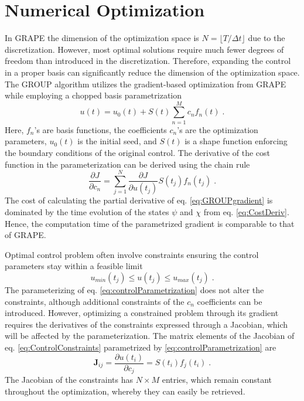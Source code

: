 \section{Numerical Optimization}

In GRAPE the dimension of the optimization space is $N = \lfloor T / \Delta t \rfloor$ due to the discretization. However, most optimal solutions require much fewer degrees of freedom than introduced in the discretization. Therefore, expanding the control in a proper basis can significantly reduce the dimension of the optimization space.
The GROUP algorithm utilizes the gradient-based optimization from GRAPE while employing a chopped basis parametrization 
\begin{equation}
	u(t) = u_0 (t) + S(t) \sum_{n=1}^{M} c_n f_n (t) \; . \label{eq:controlParametrization}
\end{equation}
Here, $f_n$'s are basis functions, the coefficients $c_n$'s are the optimization parameters, $u_0 (t)$ is the initial seed, and $S(t)$ is a shape function enforcing the boundary conditions of the original control. The derivative of the cost function in the parameterization can be derived using the chain rule
\begin{equation}
	\frac{\partial J }{\partial c_n} = \sum_{j = 1}^{N} \frac{\partial J }{\partial u(t_j)} S(t_j) f_n(t_j) \; . \label{eq:GROUPgradient} 
\end{equation}
The cost of calculating the partial derivative of eq. \eqref{eq:GROUPgradient} is dominated by the time evolution of the states $\psi$ and $\chi$ from eq. \eqref{eq:CostDeriv}. Hence, the computation time of the parametrized gradient is comparable to that of GRAPE.

Optimal control problem often involve constraints ensuring the control parameters stay within a feasible limit
\begin{equation}
	 u_{min} (t_j) \leq u(t_j) \leq u_{max} (t_j) \; .
	 \label{eq:ControlConstraints}
\end{equation}
The parameterizing of eq. \eqref{eq:controlParametrization} does not alter the constraints, although additional constraints of the $c_n$ coefficients can be introduced. However, optimizing a constrained problem through its gradient requires the derivatives of the constraints expressed through a Jacobian, which will be affected by the parameterization. The matrix elements of the Jacobian of eq. \eqref{eq:ControlConstraints} parametrized by \eqref{eq:controlParametrization} are
\begin{equation}
	\boldsymbol{J}_{ij} = \frac{\partial u(t_i)}{\partial c_j} = S(t_i) f_j (t_i) \; . \label{eq:ConstraintJacobian}
\end{equation}
The Jacobian of the constraints has $N \times M$ entries, which remain constant throughout the optimization, whereby they can easily be retrieved.